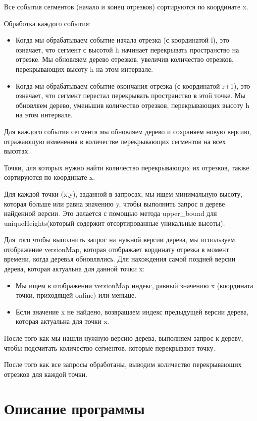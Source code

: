 \documentclass[12pt]{article}
\begin{document}
Все события сегментов (начало и конец отрезков) сортируются по координате x. 

Обработка каждого события:
\begin{itemize}
    \item Когда мы обрабатываем событие начала отрезка (с координатой l), это означает, что сегмент с высотой h начинает перекрывать пространство на отрезке. Мы обновляем дерево отрезков, увеличив количество отрезков, перекрывающих высоту h на этом интервале.
    \item Когда мы обрабатываем событие окончания отрезка (с координатой r+1), это означает, что сегмент перестал перекрывать пространство в этой точке. Мы обновляем дерево, уменьшив количество отрезков, перекрывающих высоту h на этом интервале.
\end{itemize}

Для каждого события сегмента мы обновляем дерево и сохраняем новую версию, отражающую изменения в количестве перекрывающих сегментов на всех высотах.

Точки, для которых нужно найти количество перекрывающих их отрезков, также сортируются по координате x.

Для каждой точки (x,y), заданной в запросах, мы ищем минимальную высоту, которая больше или равна значению y, чтобы выполнить запрос в дереве найденной версии.
Это делается с помощью метода upper{\_}bound для uniqueHeights(который содержит отсортированные уникальные высоты).

Для того чтобы выполнить запрос на нужной версии дерева, мы используем отображение versionMap, которая отображает кординату отрезка в момент времени,
когда деревья обновлялись. Для нахождения самой поздней версии дерева, которая актуальна для данной точки x:
\begin{itemize}
    \item Мы ищем в отображении versionMap индекс, равный значению x (координата точки, приходящей online) или меньше.
    \item Если значение x не найдено, возвращаем индекс предыдущей версии дерева, которая актуальна для точки x.
\end{itemize}

После того как мы нашли нужную версию дерева, выполняем запрос к дереву, чтобы подсчитать количество сегментов, которые перекрывают точку.

После того как все запросы обработаны, выводим количество перекрывающих отрезков для каждой точки.

\newpage
\section*{Описание программы}
\end{document}
